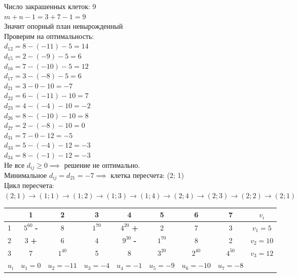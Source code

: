 \begin{flushleft}
Число закрашенных клеток: 9\\
$m + n - 1 = 3 + 7 - 1 = 9$\\
Значит опорный план невырожденный\\
Проверим на оптимальность:\\
$d_{12} = 8 - (-11) - 5 = 14$\\
$d_{15} = 2 - (-9) - 5 = 6$\\
$d_{16} = 7 - (-10) - 5 = 12$\\
$d_{17} = 3 - (-8) - 5 = 6$\\
$d_{21} = 3 - 0 - 10 = -7$\\
$d_{22} = 6 - (-11) - 10 = 7$\\
$d_{23} = 4 - (-4) - 10 = -2$\\
$d_{26} = 8 - (-10) - 10 = 8$\\
$d_{27} = 2 - (-8) - 10 = 0$\\
$d_{31} = 7 - 0 - 12 = -5$\\
$d_{33} = 5 - (-4) - 12 = -3$\\
$d_{34} = 8 - (-1) - 12 = -3$\\
Не все $d_{ij} \ge 0 \implies$ решение не оптимально.\\
Минимальное $d_{ij} = d_{21} = -7 \implies$ клетка пересчета: (2; 1)\\
Цикл пересчета:\\
$(2; 1) \rightarrow (1; 1) \rightarrow (1; 2) \rightarrow (1; 3) \rightarrow (1; 4) \rightarrow (2; 4) \rightarrow (2; 3) \rightarrow (2; 2) \rightarrow (2; 1)$
\end{flushleft}

\begin{center}
    \begin{tabular}{|a | c | c | c | c | c | c | c | c|} 
         \hline
            & 1 & 2 & 3 & 4 & 5 & 6 & 7 & $v_{i}$\\
          &  $5^{60}$ {\bf-} & 8 &  $1^{70}$ &  $4^{20}$ {\bf+} & 2 & 7 & 3 & {\small$v_1 = 5$}\\
          & 3 {\bf+} & 6 & 4 &  $9^{30}$ {\bf-} &  $1^{70}$ & 8 & 2 & {\small$v_2 = 10$}\\
          & 7 &  $1^{40}$ & 5 & 8 &  $3^{20}$ &  $2^{40}$ &  $4^{50}$ & {\small$v_3 = 12$}\\
         \hline
            $u_{i}$ & {\small$u_1 = 0$} & {\small$u_2 = -11$} & {\small$u_3 = -4$} & {\small$u_4 = -1$} & {\small$u_5 = -9$} & {\small$u_6 = -10$} & {\small$u_7 = -8$} & \\
        \hline
    \end{tabular}
\end{center}

